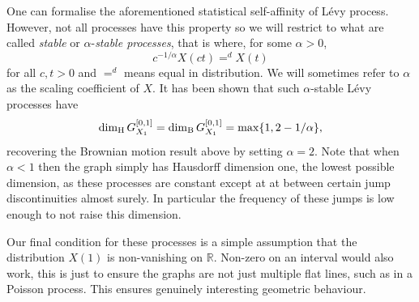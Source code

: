 One can formalise the aforementioned statistical self-affinity of L\'evy process. However, not all processes have this property so we will restrict to what are called \textit{stable} or $\alpha$-\textit{stable processes}, that is where, for some $\alpha > 0$,
\[
c^{-1/\alpha}X(ct) =^d X(t)
\]
for all $c,t > 0$ and $=^d$ means equal in distribution. We will sometimes refer to $\alpha$ as the scaling coefficient of $X$. It has been shown that such $\alpha$-stable L\'evy processes have
\[
\dim_\text{H} G_{X_1}^{[0,1]} = \dim_{\textup{B}}  G_{X_1}^{[0,1]} = \max\{1, 2 - 1/\alpha\},
\]
recovering the Brownian motion result above by setting $\alpha = 2$. Note that when $\alpha < 1$ then the graph simply has Hausdorff dimension one, the lowest possible dimension, as these processes are constant except at at between certain jump discontinuities almost surely. In particular the frequency of these jumps is low enough to not raise this dimension.

Our final condition for these processes is a simple assumption that the distribution $X(1)$ is non-vanishing on $\mathbb{R}$. Non-zero on an interval would also work, this is just to ensure the graphs are not just multiple flat lines, such as in a Poisson process. This ensures genuinely interesting geometric behaviour.

